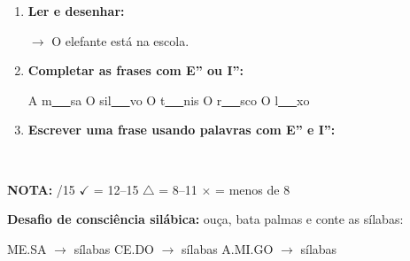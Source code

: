 \begin{exercicio}
\begin{enumerate}[resume]
  \item \textbf{Ler e desenhar:}
  \begin{center}
  $\rightarrow$ O elefante está na escola.
  \end{center}
  \begin{center}
  \end{center}

  \item \textbf{Completar as frases com E'' ou I'':}
  \begin{center}
  A m\underline{~~~}sa \quad O sil\underline{~~~}vo \quad O t\underline{~~~}nis \quad O r\underline{~~~}sco \quad O l\underline{~~~}xo
  \end{center}

  \item \textbf{Escrever uma frase usando palavras com E'' e I'':}
  \begin{center}
  \underline{\hspace{12cm}} \\
  \underline{\hspace{12cm}}
  \end{center}
\end{enumerate}

\noindent\textbf{NOTA:} \underline{\hspace{1cm}}/15 \quad $\checkmark$ = 12--15 \quad $\triangle$ = 8--11 \quad $\times$ = menos de 8
\end{exercicio}

\begin{somsilaba}[title={\faMusic~Som das S\'ilabas --- B\^onus (n\~ao vale nota)}]
\textbf{Desafio de consci\^encia sil\'abica:} ou\c{c}a, bata palmas e conte as s\'ilabas:
\begin{center}
ME.SA $\rightarrow$ \underline{\hspace{1cm}} s\'ilabas \quad CE.DO $\rightarrow$ \underline{\hspace{1cm}} s\'ilabas \quad A.MI.GO $\rightarrow$ \underline{\hspace{1cm}} s\'ilabas
\end{center}
\end{somsilaba}



